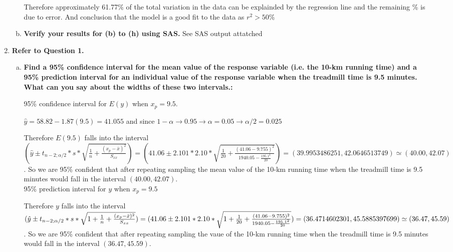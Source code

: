 \documentclass{article}
\begin{document}
\begin{enumerate}[1.]
\begin{enumerate}[(a)]
Therefore approximately 61.77\% of the total variation in the data can be explainded by the regression line and the remaining \% is due to error. And conclusion that the model is a good fit to the data as $r^2 > 50\%$

  \item \textbf{Verify your results for (b) to (h) using SAS.}
See SAS output attatched


\end{enumerate}

\item \textbf{Refer to Question 1.}
\begin{enumerate}[(a)]
\item \textbf{Find a 95\% confidence interval for the mean
value of the response variable (i.e. the 10-km running time) and a 95\% prediction
interval for an individual value of the response variable when the treadmill time is 9.5
minutes. What can you say about the widths of these two intervals.:}


95\% confidence interval for $E(y)$ when $x_p =9.5$. 

$\hat{y} = 58.82 - 1.87(9.5) = 41.055$ and since $1 - \alpha \to 0.95 \to \alpha = 0.05 \to \alpha/2 = 0.025$

Therefore $E(9.5)$ falls into the interval \\
$(\hat{y} \pm t_{n-2;\alpha/2} * s * \sqrt{ \frac{1}{n} + \frac{(x_p - \bar{x})^2}{S_{xx}}}) = (41.06 \pm 2.101 * 2.10 * \sqrt{\frac{1}{20} + \frac{(41.06 - 9.755)^2}{ 1940.05 - \frac{195.1^2}{20}} }) = (39.9953486251, 42.0646513749) \simeq (40.00, 42.07)$. So we are 95\% confident that after repeating sampling the mean value of the 10-km running time when the treadmill time is 9.5 minutes would fall in the interval $(40.00, 42.07)$. \\

95\% prediction interval for $y$ when $x_p = 9.5$

Therefore $y$ falls into the interval \\
$(\hat{y} \pm t_{n-2;\alpha/2} * s * \sqrt{ 1+ \frac{1}{n} + \frac{(x_p - \bar{x})^2}{S_{xx}}}) = (41.06 \pm 2.101 * 2.10 * \sqrt{1 + \frac{1}{20} + \frac{(41.06 - 9.755)^2}{ 1940.05 - \frac{195.1^2}{20}} }) = \\
(36.4714602301, 45.5885397699) \simeq (36.47, 45.59)$. So we are 95\% confident that after repeating sampling the vaue of the 10-km running time when the treadmill time is 9.5 minutes would fall in the interval $(36.47, 45.59)$. \\


\end{enumerate}
\end{enumerate}
\end{document}
